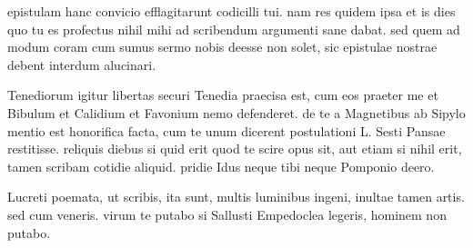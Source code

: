 


 epistulam hanc convicio efflagitarunt codicilli tui. nam res quidem ipsa et is dies quo tu es profectus nihil mihi ad scribendum argumenti sane dabat. sed quem ad modum coram cum sumus sermo nobis deesse non solet, sic epistulae nostrae debent interdum alucinari.

 Tenediorum igitur libertas securi Tenedia praecisa est, cum eos praeter me et Bibulum et Calidium et Favonium nemo defenderet. de te a Magnetibus ab Sipylo mentio est honorifica facta, cum te unum dicerent postulationi L. Sesti Pansae restitisse. reliquis diebus si quid erit quod te scire opus sit, aut etiam si nihil erit, tamen scribam cotidie aliquid. pridie Idus neque tibi neque Pomponio deero.

 Lucreti poemata, ut scribis, ita sunt, multis luminibus ingeni, inultae tamen artis. sed cum veneris. virum te putabo si Sallusti Empedoclea legeris, hominem non putabo.
